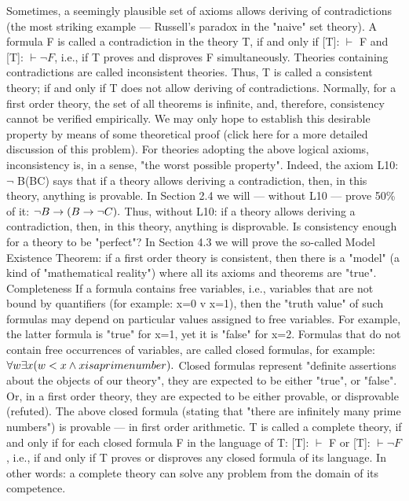 Sometimes, a seemingly plausible set of axioms allows deriving of contradictions (the most striking
example --- Russell's paradox in the "naive" set theory). A formula F is called a contradiction in the
theory T, if and only if [T]: \(\vdash\) F and [T]: \(\vdash \neg F\), i.e., if T proves and disproves F simultaneously. Theories
containing contradictions are called inconsistent theories. Thus, T is called a consistent theory; if and
only if T does not allow deriving of contradictions.
Normally, for a first order theory, the set of all theorems is infinite, and, therefore, consistency cannot be
verified empirically. We may only hope to establish this desirable property by means of some
theoretical proof (click here for a more detailed discussion of this problem).
For theories adopting the above logical axioms, inconsistency is, in a sense, "the worst possible property".
Indeed, the axiom L10: \(\neg\) B\IMPLIES (B\IMPLIES C) says that if a theory allows deriving a contradiction, then, in this
theory, anything is provable. In Section 2.4 we will --- without L10 --- prove 50\% of it: \(\neg B\rightarrow (B\rightarrow \neg C).\)
Thus, without L10: if a theory allows deriving a contradiction, then, in this theory, anything is
disprovable.
Is consistency enough for a theory to be "perfect"? In Section 4.3 we will prove the so-called Model
Existence Theorem: if a first order theory is consistent, then there is a "model" (a kind of "mathematical
reality") where all its axioms and theorems are "true".
Completeness
If a formula contains free variables, i.e., variables that are not bound by quantifiers (for example: x=0 v
x=1), then the "truth value" of such formulas may depend on particular values assigned to free variables.
For example, the latter formula is "true" for x=1, yet it is "false" for x=2. Formulas that do not contain
free occurrences of variables, are called closed formulas, for example:
\(\forall w\exists x( w<x \wedge  x is a prime number).\)
Closed formulas represent "definite assertions about the objects of our theory", they are expected to be
either "true", or "false". Or, in a first order theory, they are expected to be either provable, or disprovable
(refuted). The above closed formula (stating that "there are infinitely many prime numbers") is provable ---
in first order arithmetic.
T is called a complete theory, if and only if for each closed formula F in the language of T: [T]: \(\vdash\) F or
[T]: \(\vdash \neg F\), i.e., if and only if T proves or disproves any closed formula of its language. In other words: a
complete theory can solve any problem from the domain of its competence.
